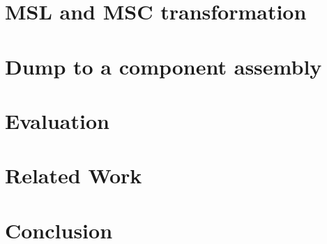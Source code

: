 \documentclass{acm_proc_article-sp}
\begin{document}
\section{MSL and MSC transformation}
\label{sect:msmsc}

\section{Dump to a component assembly}
\label{sect:component}

\section{Evaluation}
\label{sect:eval}

\section{Related Work}
\label{sect:related}

\section{Conclusion}
\label{sect:conclusion}



  
\end{document}
